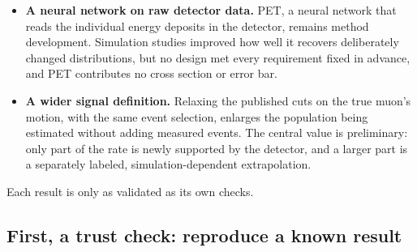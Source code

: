 \begin{itemize}
\item \textbf{A neural network on raw detector data.} PET, a neural network that reads the individual energy deposits in the detector, remains method development. Simulation studies improved how well it recovers deliberately changed distributions, but no design met every requirement fixed in advance, and PET contributes no cross section or error bar.
\item \textbf{A wider signal definition.} Relaxing the published cuts on the true muon's motion, with the same event selection, enlarges the population being estimated without adding measured events. The central value is preliminary: only part of the rate is newly supported by the detector, and a larger part is a separately labeled, simulation-dependent extrapolation.
\end{itemize}
Each result is only as validated as its own checks.

\subsection*{First, a trust check: reproduce a known result}

